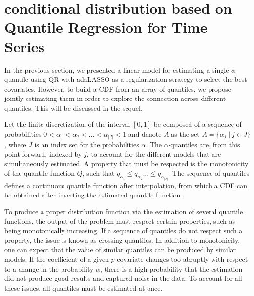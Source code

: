 \section{conditional distribution based on Quantile Regression for Time Series}

In the previous section, we presented a linear model for estimating a single $\alpha$-quantile using QR with adaLASSO as a regularization strategy to select the best covariates. However, to build a CDF from an array of quantiles, we propose jointly estimating them in order to explore the connection across different quantiles. This will be discussed in the sequel.

Let the finite discretization of the interval $[0,1]$ be composed of a sequence of probabilities $0 < \alpha_1 < \alpha_2 < \dots < \alpha_{|J|} < 1$ and denote $A$ as the set $A = \{ \alpha_j \mid j \in J \}$, where $J$ is an index set for the probabilities $\alpha$. 
The $\alpha$-quantiles are, from this point forward, indexed by $j$, to account for the different models that are simultaneously estimated. A property that must be respected is the monotonicity of the quantile function $Q$, such that $q_{\alpha_1} \leq q_{\alpha_2} \dots \leq q_{\alpha_{|J|}}$.
The sequence of quantiles defines a continuous quantile function after interpolation, from which a CDF can be obtained after inverting the estimated quantile function.


To produce a proper distribution function via the estimation of several quantile functions, the output of the problem must respect certain properties, such as being monotonically increasing. 
If a sequence of quantiles do not respect such a property, the issue is known as crossing quantiles.
In addition to monotonicity, one can expect that the value of similar quantiles can be produced by similar models. 
If the coefficient of a given $p$ covariate changes too abruptly with respect to a change in the probability $\alpha$, there is a high probability that the estimation did not produce good results and captured noise in the data.  
To account for all these issues, all quantiles must be estimated at once. 

